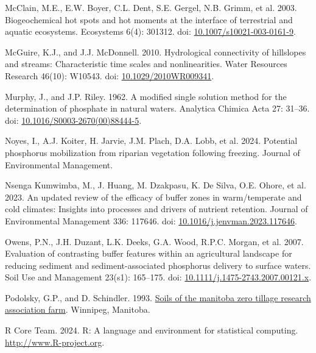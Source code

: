 \documentclass[
]{agujournal2019}
\newlength{\cslhangindent}
\newenvironment{CSLReferences}[2] %
 {\begin{list}{}{%
  \setlength{\itemindent}{0pt}
  \setlength{\leftmargin}{0pt}
  \setlength{\parsep}{0pt}
  \ifodd #1
   \setlength{\leftmargin}{\cslhangindent}
   \setlength{\itemindent}{-1\cslhangindent}
  \fi
  \setlength{\itemsep}{#2\baselineskip}}}
 {\end{list}}
\begin{document}
\begin{CSLReferences}{1}{1}
McClain, M.E., E.W. Boyer, C.L. Dent, S.E. Gergel, N.B. Grimm, et al.
2003. Biogeochemical hot spots and hot moments at the interface of
terrestrial and aquatic ecosystems. Ecosystems 6(4): 301312. doi:
\href{https://doi.org/10.1007/s10021-003-0161-9}{10.1007/s10021-003-0161-9}.

McGuire, K.J., and J.J. McDonnell. 2010. Hydrological connectivity of
hillslopes and streams: Characteristic time scales and nonlinearities.
Water Resources Research 46(10): W10543. doi:
\href{https://doi.org/10.1029/2010WR009341}{10.1029/2010WR009341}.

Murphy, J., and J.P. Riley. 1962. A modified single solution method for
the determination of phosphate in natural waters. Analytica Chimica Acta
27: 31--36. doi:
\href{https://doi.org/10.1016/S0003-2670(00)88444-5}{10.1016/S0003-2670(00)88444-5}.

Noyes, I., A.J. Koiter, H. Jarvie, J.M. Plach, D.A. Lobb, et al. 2024.
Potential phosphorus mobilization from riparian vegetation following
freezing. Journal of Environmental Management.

Nsenga Kumwimba, M., J. Huang, M. Dzakpasu, K. De Silva, O.E. Ohore, et
al. 2023. An updated review of the efficacy of buffer zones in
warm/temperate and cold climates: Insights into processes and drivers of
nutrient retention. Journal of Environmental Management 336: 117646.
doi:
\href{https://doi.org/10.1016/j.jenvman.2023.117646}{10.1016/j.jenvman.2023.117646}.

Owens, P.N., J.H. Duzant, L.K. Deeks, G.A. Wood, R.P.C. Morgan, et al.
2007. Evaluation of contrasting buffer features within an agricultural
landscape for reducing sediment and sediment-associated phosphorus
delivery to surface waters. Soil Use and Management 23(s1): 165--175.
doi:
\href{https://doi.org/10.1111/j.1475-2743.2007.00121.x}{10.1111/j.1475-2743.2007.00121.x}.

Podolsky, G.P., and D. Schindler. 1993.
\href{https://www.manitoba.ca/agriculture/soil/soil-survey/pubs/fss02s00943.pdf}{Soils
of the manitoba zero tillage research association farm}. Winnipeg,
Manitoba.

R Core Team. 2024. R: A language and environment for statistical
computing. \url{http://www.R-project.org}.


\end{CSLReferences}
\end{document}
